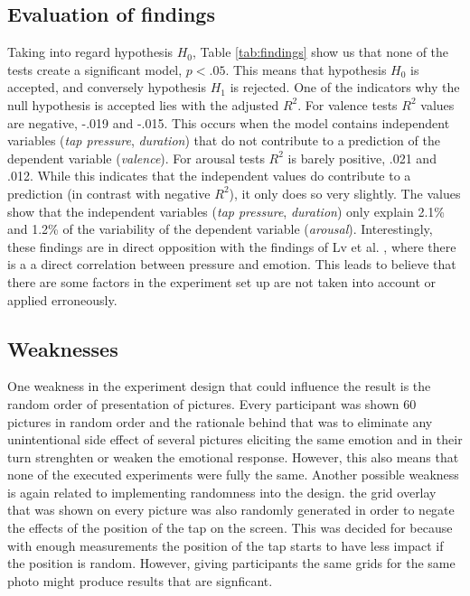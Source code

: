 \documentclass{sigchi}
\begin{document}
\subsection{Evaluation of findings} %
\label{sub:evaluation_of_findings}
Taking into regard hypothesis $H_0$, Table \ref{tab:findings} show us that none of the tests create a significant model, $p < .05$. This means that hypothesis $H_0$ is accepted, and conversely hypothesis $H_1$ is rejected. One of the indicators why the null hypothesis is accepted lies with the adjusted $R^2$. For valence tests $R^2$ values are negative, -.019 and -.015. This occurs when the model contains independent variables (\textit{tap pressure}, \textit{duration}) that do not contribute to a prediction of the dependent variable (\textit{valence}). For arousal tests $R^2$ is barely positive, .021 and .012. While this indicates that the independent values do contribute to a prediction (in contrast with negative $R^2$), it only does so very slightly. The values show that the independent variables (\textit{tap pressure}, \textit{duration}) only explain 2.1\% and 1.2\% of the variability of the dependent variable (\textit{arousal}). Interestingly, these findings are in direct opposition with the findings of Lv et al. \cite{H.R.LvZ.L.LinW.J.Yin2008} , where there is a a direct correlation between pressure and emotion. This leads to believe that there are some factors in the experiment set up are not taken into account or applied erroneously.

\subsection{Weaknesses}
One weakness in the experiment design that could influence the result is the random order of presentation of pictures. Every participant was shown 60 pictures in random order and the rationale behind that was to eliminate any unintentional side effect of several pictures eliciting the same emotion and in their turn strenghten or weaken the emotional response. However, this also means that none of the executed experiments were fully the same. Another possible weakness is again related to implementing randomness into the design. the grid overlay that was shown on every picture was also randomly generated in order to negate the effects of the position of the tap on the screen. This was decided for because with enough measurements the position of the tap starts to have less impact if the position is random. However, giving participants the same grids for the same photo might produce results that are signficant.
\end{document}
